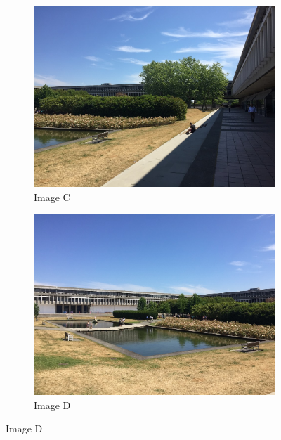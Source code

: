 \documentclass[]{article}
\begin{document}
\begin{figure}[h]
	\begin{subfigure}[h]{0.5\textwidth}
		\includegraphics[scale=0.25]{results/p1_noblend/C}
		\centering
		\caption{Image C}
	\end{subfigure}%
	\hfill
	\begin{subfigure}[h]{0.5\textwidth}
		\includegraphics[scale=0.25]{results/p1_noblend/D}
		\centering
		\caption{Image D}
	\end{subfigure}%
	\centering
\end{figure}
\end{document}
